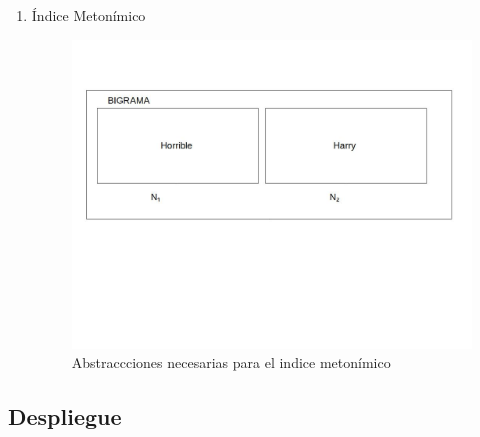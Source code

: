 \documentclass[twoside]{article}
\begin{document}
\begin{enumerate}
\item Índice Metonímico
\label{sec:org552e7ed}
\begin{figure}[htbp]
\centering
\includegraphics[width=.9\linewidth]{./assets/metonimia.jpg}
\caption{Abstraccciones necesarias para el indice metonímico}
\end{figure}
\end{enumerate}

\subsection{Despliegue}
\label{sec:orge23bbec}
\end{document}
